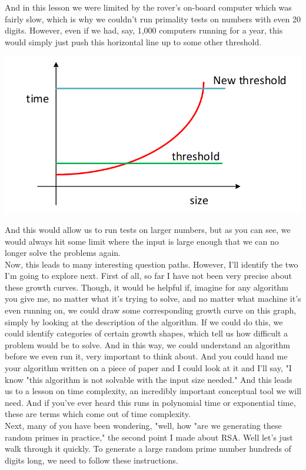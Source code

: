 \documentclass{report}
\begin{document}
And in this lesson we were limited by the rover's on-board computer which was fairly slow, which is why we couldn't run primality tests on numbers with even 20 digits. However, even if we had, say, 1,000 computers running for a year, this would simply just push this horizontal line up to some other threshold. 
\begin{center}
	\includegraphics[scale=1]{70.png}
\end{center}
And this would allow us to run tests on larger numbers, but as you can see, we would always hit some limit where the input is large enough that we can no longer solve the problems again. \\
Now, this leads to many interesting question paths. However, I'll identify the two I'm going to explore next. First of all, so far I have not been very precise about these growth curves. Though, it would be helpful if, imagine for any algorithm you give me, no matter what it's trying to solve, and no matter what machine it's even running on, we could draw some corresponding growth curve on this graph, simply by looking at the description of the algorithm. If we could do this, we could identify categories of certain growth shapes, which tell us how difficult a problem would be to solve. And in this way, we could understand an algorithm before we even run it, very important to think about. And you could hand me your algorithm written on a piece of paper and I could look at it and I'll say, "I know "this algorithm is not solvable with the input size needed." And this leads us to a lesson on time complexity, an incredibly important conceptual tool we will need. And if you've ever heard this runs in polynomial time or exponential time, these are terms which come out of time complexity.\\
Next, many of you have been wondering, "well, how "are we generating these random primes in practice," the second point I made about RSA. Well let's just walk through it quickly. To generate a large random prime number hundreds of digits long, we need to follow these instructions.\\
\end{document}
